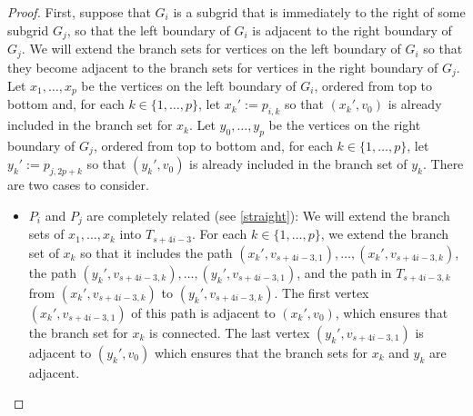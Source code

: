 \documentclass[kpfonts,lotsofwhite]{patmorin}
\theoremstyle{plain}
\theoremstyle{definition}
\begin{document}
\begin{proof}
  First, suppose that $G_i$ is a subgrid that is immediately to the right of some subgrid $G_j$, so that the left boundary of $G_i$ is adjacent to the right boundary of $G_j$.  We will extend the branch sets for vertices on the left boundary of $G_i$ so that they become adjacent to the branch sets for vertices in the right boundary of $G_j$. Let $x_1,\ldots,x_p$ be the vertices on the left boundary of $G_i$, ordered from top to bottom and, for each $k\in\{1,\ldots,p\}$, let $x_k':=p_{i,k}$ so that $(x_k',v_0)$ is already included in the branch set for $x_k$.  Let $y_0,\ldots,y_p$ be the vertices on the right boundary of $G_j$, ordered from top to bottom and, for each $k\in\{1,\ldots,p\}$, let $y_k':=p_{j,2p+k}$ so that $(y_k',v_0)$ is already included in the branch set of $y_k$. There are two cases to consider.

  \begin{itemize}
    \item $P_i$ and $P_j$ are completely related (see \cref{straight}): We will extend the branch sets of $x_1,\ldots,x_k$ into $T_{s+4i-3}$.  For each $k\in\{1,\ldots,p\}$, we extend the branch set of $x_k$ so that it includes the path $(x_k',v_{s+4i-3,1}),\ldots,(x_k',v_{s+4i-3,k})$, the path
    $(y_k',v_{s+4i-3,k}),\ldots,(y_k',v_{s+4i-3,1})$, and the path in $T_{s+4i-3,k}$ from $(x_k',v_{s+4i-3,k})$ to $(y_k',v_{s+4i-3,k})$.  The first vertex $(x_k',v_{s+4i-3,1})$ of this path is adjacent to $(x_k',v_0)$, which ensures that the branch set for $x_k$ is connected.  The last vertex $(y_k',v_{s+4i-3,1})$ is adjacent to $(y_k',v_0)$ which ensures that the branch sets for $x_k$ and $y_k$ are adjacent.


\end{itemize}
\end{proof}
\end{document}
